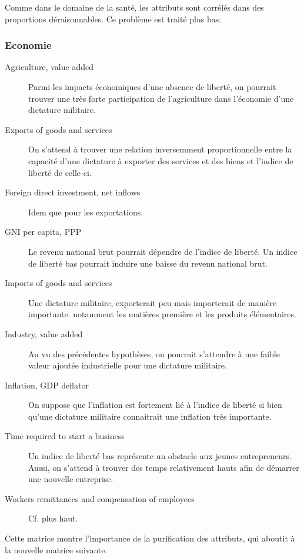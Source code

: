 Comme dans le domaine de la santé, les attributs sont corrélés dans des proportions déraisonnables. Ce problème est traité plus bas.

\subsubsection{Economie}
\begin{description}
\item [Agriculture, value added]
Parmi les impacts économiques d'une absence de liberté, on pourrait trouver une très forte participation de l'agriculture dans l'économie d'une dictature militaire.
\item [Exports of goods and services]
On s'attend à trouver une relation inversemment proportionnelle entre la capacité d'une dictature à exporter des services et des biens et l'indice de liberté de celle-ci.
\item [Foreign direct investment, net inflows]
Idem que pour les exportations. 
\item [GNI per capita, PPP]
Le revenu national brut pourrait dépendre de l'indice de liberté. Un indice de liberté bas pourrait induire une baisse du revenu national brut.
\item [Imports of goods and services] 
Une dictature militaire, exporterait peu mais importerait de manière importante. notamment les matières première et les produits élémentaires.
\item [Industry, value added]
Au vu des précédentes hypothèses, on pourrait s'attendre à une faible valeur ajoutée industrielle pour une dictature militaire. 
\item [Inflation, GDP deflator] 
On suppose que l'inflation est fortement lié à l'indice de liberté si bien qu'une dictature militaire connaitrait une inflation très importante.
\item [Time required to start a business]
Un indice de liberté bas représente un obstacle aux jeunes entrepreneurs. Aussi, on s'attend à trouver des temps relativement hauts afin de démarrer une nouvelle entreprise. 
\item [Workers remittances and compensation of employees]
Cf. plus haut.
\end{description}

Cette matrice montre l'importance de la purification des attributs, qui aboutit à la nouvelle matrice suivante.

